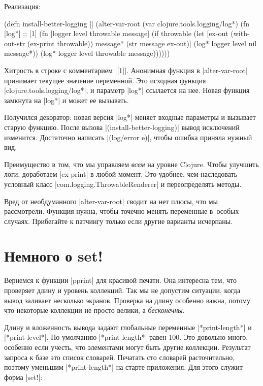 \noindent
Реализация:

\begin{english}
  \begin{clojure}
(defn install-better-logging []
  (alter-var-root
   (var clojure.tools.logging/log*)
   (fn [log*] ;; [1]
     (fn [logger level throwable message]
       (if throwable
         (let [ex-out (with-out-str (ex-print throwable))
               message* (str message \newline ex-out)]
           (log* logger level nil message*))
         (log* logger level throwable message))))))
  \end{clojure}
\end{english}

Хитрость в строке с комментарием \spverb|[1]|. Анонимная функция в
\spverb|alter-var-root| принимает текущее значение переменной. Это исходная
функция \spverb|clojure.tools.logging/log*|, и параметр \spverb|log*| ссылается
на нее. Новая функция замкнута на \spverb|log*| и может ее вызывать.

Получился декоратор: новая версия \spverb|log*| меняет входные параметры и
вызывает старую функцию. После вызова \spverb|(install-better-logging)| вывод
исключений изменится. Достаточно написать \spverb|(log/error e)|, чтобы ошибка
приняла нужный вид.

Преимущество в том, что мы управляем \emph{всем} на уровне Clojure. Чтобы
улучшить логи, доработаем \spverb|ex-print| в любой момент. Это удобнее, чем
наследовать условный класс \spverb|com.logging.ThrowableRenderer| и
переопределять методы.

Вред от необдуманного \spverb|alter-var-root| сводит на нет плюсы, что мы
рассмотрели. Функция нужна, чтобы точечно менять переменные в~особых
случаях. Прибегайте к патчингу только если другие варианты исчерпаны.

\section{Немного о set!}

Вернемся к функции \spverb|pprint| для красивой печати. Она интересна тем, что
проверяет длину и уровень коллекций. Так мы не допустим ситуации, когда вывод
заливает несколько экранов. Проверка на длину особенно важна, потому что
некоторые коллекции не просто велики, а \emph{бесконечны}.

Длину и вложенность вывода задают глобальные переменные \spverb|*print-length*|
и \spverb|*print-level*|. По умолчанию \spverb|*print-length*| равен 100. Это
довольно много, особенно если учесть, что элементами могут быть другие
коллекции. Результат запроса к базе это список словарей. Печатать сто
словарей расточительно, поэтому уменьшим \spverb|*print-length*| на старте
приложения. Для этого служит форма \spverb|set!|:

